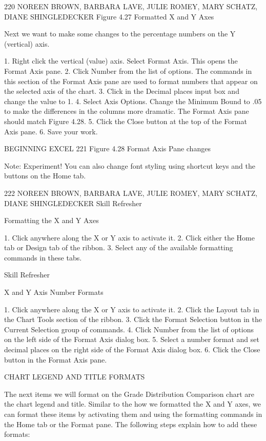 220 NOREEN BROWN, BARBARA LAVE, JULIE ROMEY, MARY SCHATZ, DIANE SHINGLEDECKER
Figure 4.27 Formatted X and Y Axes


Next we want to make some changes to the percentage numbers on the Y (vertical) axis.

1. Right click the vertical (value) axis. Select Format Axis. This opens the Format Axis pane.
2. Click Number from the list of options. The commands in this section of the Format Axis pane
are used to format numbers that appear on the selected axis of the chart.
3. Click in the Decimal places input box and change the value to 1.
4. Select Axis Options. Change the Minimum Bound to .05 to make the differences in the
columns more dramatic. The Format Axis pane should match Figure 4.28.
5. Click the Close button at the top of the Format Axis pane.
6. Save your work.




BEGINNING EXCEL 221
Figure 4.28 Format Axis Pane changes




Note: Experiment! You can also change font styling using shortcut keys and the buttons on the Home
tab.




222 NOREEN BROWN, BARBARA LAVE, JULIE ROMEY, MARY SCHATZ, DIANE SHINGLEDECKER
Skill Refresher


Formatting the X and Y Axes

1. Click anywhere along the X or Y axis to activate it.
2. Click either the Home tab or Design tab of the ribbon.
3. Select any of the available formatting commands in these tabs.




Skill Refresher


X and Y Axis Number Formats

1. Click anywhere along the X or Y axis to activate it.
2. Click the Layout tab in the Chart Tools section of the ribbon.
3. Click the Format Selection button in the Current Selection group of commands.
4. Click Number from the list of options on the left side of the Format Axis dialog box.
5. Select a number format and set decimal places on the right side of the Format Axis dialog box.
6. Click the Close button in the Format Axis pane.



CHART LEGEND AND TITLE FORMATS

The next items we will format on the Grade Distribution Comparison chart are the chart legend and
title. Similar to the how we formatted the X and Y axes, we can format these items by activating them
and using the formatting commands in the Home tab or the Format pane. The following steps explain
how to add these formats:

